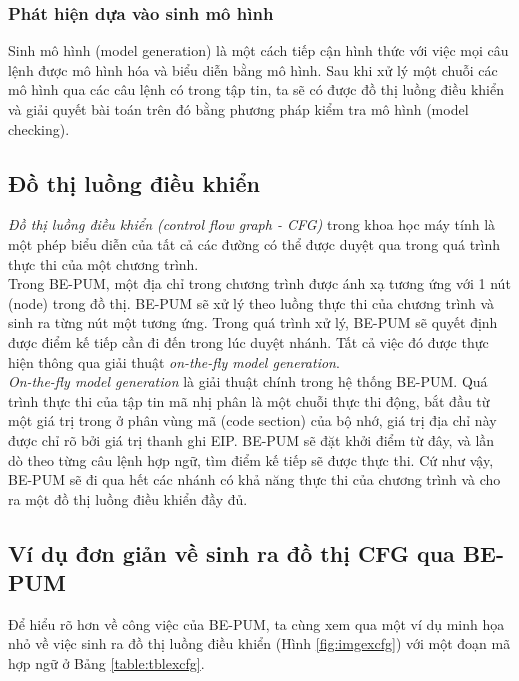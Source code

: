 		\subsubsection{Phát hiện dựa vào sinh mô hình}

Sinh mô hình (model generation) là một cách tiếp cận hình thức với việc mọi câu lệnh được mô hình hóa và biểu diễn bằng mô hình. Sau khi xử lý một chuỗi các mô hình qua các câu lệnh có trong tập tin, ta sẽ có được đồ thị luồng điều khiển và giải quyết bài toán trên đó bằng phương pháp kiểm tra mô hình (model checking).

	\subsection{Đồ thị luồng điều khiển}

\textit{Đồ thị luồng điều khiển (control flow graph - CFG)} trong khoa học máy tính là một phép biểu diễn của tất cả các đường có thể được duyệt qua trong quá trình thực thi của một chương trình. \cite{cfg-def}\\

Trong BE-PUM, một địa chỉ trong chương trình được ánh xạ tương ứng với 1 nút (node) trong đồ thị. BE-PUM sẽ xử lý theo luồng thực thi của chương trình và sinh ra từng nút một tương ứng. Trong quá trình xử lý, BE-PUM sẽ quyết định được điểm kế tiếp cần đi đến trong lúc duyệt nhánh. Tất cả việc đó được thực hiện thông qua giải thuật \textit{on-the-fly model generation}.\\

\textit{On-the-fly model generation} là giải thuật chính trong hệ thống BE-PUM. Quá trình thực thi của tập tin mã nhị phân là một chuỗi thực thi động, bắt đầu từ một giá trị trong ở phân vùng mã (code section) của bộ nhớ, giá trị địa chỉ này được chỉ rõ bởi giá trị thanh ghi EIP. BE-PUM sẽ đặt khởi điểm từ đây, và lần dò theo từng câu lệnh hợp ngữ, tìm điểm kế tiếp sẽ được thực thi. Cứ như vậy, BE-PUM sẽ đi qua hết các nhánh có khả năng thực thi của chương trình và cho ra một đồ thị luồng điều khiển đầy đủ.

	\subsection{Ví dụ đơn giản về sinh ra đồ thị CFG qua BE-PUM}

Để hiểu rõ hơn về công việc của BE-PUM, ta cùng xem qua một ví dụ minh họa nhỏ về việc sinh ra đồ thị luồng điều khiển (Hình \ref{fig:imgexcfg}) với một đoạn mã hợp ngữ ở Bảng \ref{table:tblexcfg}.

